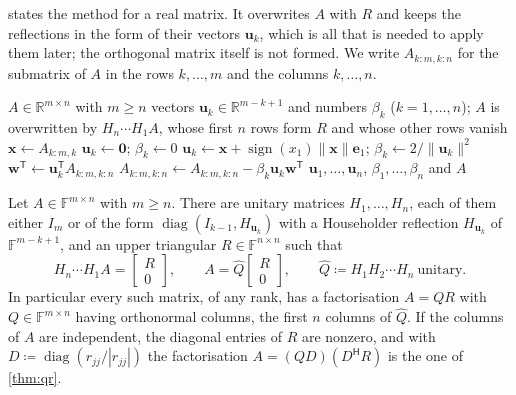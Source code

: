  states the method for a real matrix. It overwrites $A$ with $R$ and keeps the reflections in the form of their vectors $\mathbf u_k$, which is all that is needed to apply them later; the orthogonal matrix itself is not formed. We write $A_{k:m,k:n}$ for the submatrix of $A$ in the rows $k,\ldots,m$ and the columns $k,\ldots,n$.

\begin{algorithm}
\begin{algorithmic}[1]
\Require $A\in\mathbb R^{m\times n}$ with $m\ge n$
\Ensure vectors $\mathbf u_k\in\mathbb R^{m-k+1}$ and numbers $\beta_k$ ($k=1,\ldots,n$); $A$ is overwritten by $H_n\cdots H_1A$, whose first $n$ rows form $R$ and whose other rows vanish
  \State $\mathbf x\gets A_{k:m,k}$ 
    \State $\mathbf u_k\gets\mathbf 0$; $\beta_k\gets0$ 
  \Else
    \State $\mathbf u_k\gets\mathbf x+\operatorname{sign}(x_1)\|\mathbf x\|\mathbf e_1$; $\beta_k\gets2/\|\mathbf u_k\|^2$ 
    \State $\mathbf w^{\mathsf T}\gets\mathbf u_k^{\mathsf T}A_{k:m,k:n}$
    \State $A_{k:m,k:n}\gets A_{k:m,k:n}-\beta_k\mathbf u_k\mathbf w^{\mathsf T}$ 
  \EndIf
\EndFor
\State \Return $\mathbf u_1,\ldots,\mathbf u_n$, $\beta_1,\ldots,\beta_n$ and $A$
\end{algorithmic}
\caption{Householder QR factorisation (\cref{thm:householder-qr}). The $k$th reflection is $H_k=\operatorname{diag}(I_{k-1},I-\beta_k\mathbf u_k\mathbf u_k^{\mathsf T})$; the matrix $Q=H_1\cdots H_n$ is not formed. The cost is about $2mn^2-2n^3/3$ operations (\cref{prop:householder-cost}).}
\label{alg:householder-qr}
\end{algorithm}

\begin{theorem}
\label{thm:householder-qr}
Let $A\in\mathbb F^{m\times n}$ with $m\ge n$. There are unitary matrices $H_1,\ldots,H_n$, each of them either $I_m$ or of the form $\operatorname{diag}(I_{k-1},H_{\mathbf u_k})$ with a Householder reflection $H_{\mathbf u_k}$ of $\mathbb F^{m-k+1}$, and an upper triangular $R\in\mathbb F^{n\times n}$ such that
\[
H_n\cdots H_1A=\begin{bmatrix}R\\0\end{bmatrix},\qquad A=\hat Q\begin{bmatrix}R\\0\end{bmatrix},\qquad\hat Q\coloneqq H_1H_2\cdots H_n\ \text{unitary}.
\]
In particular every such matrix, of any rank, has a factorisation $A=QR$ with $Q\in\mathbb F^{m\times n}$ having orthonormal columns, the first $n$ columns of $\hat Q$. If the columns of $A$ are independent, the diagonal entries of $R$ are nonzero, and with $D\coloneqq\operatorname{diag}(r_{jj}/|r_{jj}|)$ the factorisation $A=(QD)(D^{\mathsf H}R)$ is the one of \cref{thm:qr}.
\end{theorem}


